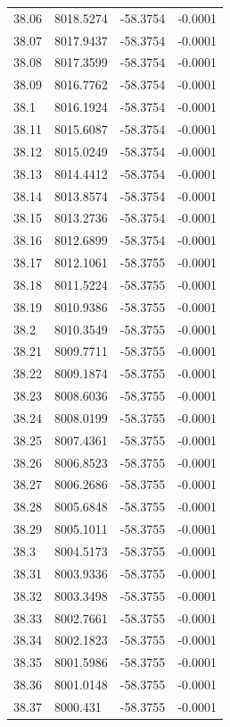 \begin{table}[H]
\begin{tabular}{llll}
38.06 & 8018.5274 & -58.3754 & -0.0001 \\
38.07 & 8017.9437 & -58.3754 & -0.0001 \\
38.08 & 8017.3599 & -58.3754 & -0.0001 \\
38.09 & 8016.7762 & -58.3754 & -0.0001 \\
38.1 & 8016.1924 & -58.3754 & -0.0001 \\
38.11 & 8015.6087 & -58.3754 & -0.0001 \\
38.12 & 8015.0249 & -58.3754 & -0.0001 \\
38.13 & 8014.4412 & -58.3754 & -0.0001 \\
38.14 & 8013.8574 & -58.3754 & -0.0001 \\
38.15 & 8013.2736 & -58.3754 & -0.0001 \\
38.16 & 8012.6899 & -58.3754 & -0.0001 \\
38.17 & 8012.1061 & -58.3755 & -0.0001 \\
38.18 & 8011.5224 & -58.3755 & -0.0001 \\
38.19 & 8010.9386 & -58.3755 & -0.0001 \\
38.2 & 8010.3549 & -58.3755 & -0.0001 \\
38.21 & 8009.7711 & -58.3755 & -0.0001 \\
38.22 & 8009.1874 & -58.3755 & -0.0001 \\
38.23 & 8008.6036 & -58.3755 & -0.0001 \\
38.24 & 8008.0199 & -58.3755 & -0.0001 \\
38.25 & 8007.4361 & -58.3755 & -0.0001 \\
38.26 & 8006.8523 & -58.3755 & -0.0001 \\
38.27 & 8006.2686 & -58.3755 & -0.0001 \\
38.28 & 8005.6848 & -58.3755 & -0.0001 \\
38.29 & 8005.1011 & -58.3755 & -0.0001 \\
38.3 & 8004.5173 & -58.3755 & -0.0001 \\
38.31 & 8003.9336 & -58.3755 & -0.0001 \\
38.32 & 8003.3498 & -58.3755 & -0.0001 \\
38.33 & 8002.7661 & -58.3755 & -0.0001 \\
38.34 & 8002.1823 & -58.3755 & -0.0001 \\
38.35 & 8001.5986 & -58.3755 & -0.0001 \\
38.36 & 8001.0148 & -58.3755 & -0.0001 \\
38.37 & 8000.431 & -58.3755 & -0.0001 \\

\end{tabular}
\end{table}
